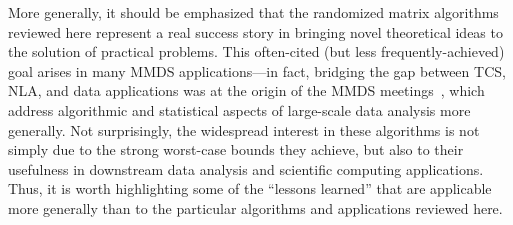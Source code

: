 \documentclass[twoside]{article}
\begin{document}
More generally, it should be emphasized that the randomized matrix algorithms 
reviewed here represent a real success story in bringing novel theoretical 
ideas to the solution of practical problems.
This often-cited (but less frequently-achieved) goal arises in many MMDS applications---in fact, bridging 
the gap between TCS, NLA, and data applications was at the origin of the 
MMDS meetings~\cite{MMDS06summary,MMDS08_arxiv,MMDS10_arxiv}, which 
address algorithmic and statistical aspects of large-scale data analysis 
more generally.
Not surprisingly, the widespread interest in these algorithms is not simply
due to the strong worst-case bounds they achieve, but also to their 
usefulness in downstream data analysis and scientific computing 
applications.
Thus, it is worth highlighting some of the ``lessons learned'' that are 
applicable more generally than to the particular algorithms and applications 
reviewed here.
\end{document}
